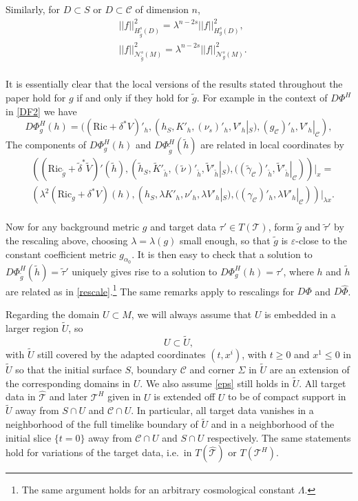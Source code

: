 \documentclass[10pt]{amsart}
\renewcommand{\a}{\alpha}
\newcommand{\g}{\gamma}
\renewcommand{\d}{\delta}
\newcommand{\e}{\varepsilon}
\newcommand{\Si}{\Sigma}
\renewcommand{\l}{\lambda}
\newcommand{\cC}{{\mathcal C}}
\newcommand{\cT}{{\mathcal T}}
\newcommand{\cN}{{\mathcal N}}
\newcommand{\Ric}{\mathrm{Ric}}
\newcommand{\be}{\begin{equation}}
\newcommand{\ee}{\end{equation}}
\newcommand{\bes}{\begin{equation*}}
\newcommand{\ees}{\end{equation*}}
\renewcommand{\hat}{\widehat}
\newcommand{\<}{\langle}
\renewcommand{\>}{\rangle}
\newcommand{\w}{\widetilde}
\theoremstyle{plain}
\theoremstyle{remark}
\theoremstyle{definition}
\numberwithin{equation}{section}
\begin{document}
  Similarly, for $D \subset S$ or $D \subset \cC$ of dimension $n$, 
\be \label{lscale}
\begin{split}
&||f||_{H_{\w g}^s(D)}^2 = \l^{n - 2s} ||f||_{H_g^s(D)}^2, \\ 
&||f||_{\cN_{\w g}^s(M)}^2 = \l^{n- 2s} ||f||_{\cN_g^s(M)}^2 . \\
\end{split}
\ee
 
  \medskip 
 
  It is essentially clear that the local versions of the results stated throughout the paper hold for $g$ if and only if they hold for $\w g$. For example 
in the context of $D\Phi^H$ in \eqref{DF2} we have  
$$D\Phi_g^H(h) = ((\Ric + \d^*V)'_h, (h_S, K'_h, (\nu_s)'_h, V'_h |_S), (g_{\cC})'_h, V'_h |_{\cC}),$$
The components of $D\Phi_g^H(h)$ and $D\Phi_{\w g}^H(\w h)$ are related in local coordinates by
\bes
\begin{split}
&((\Ric_{\w g} + \w \d^*\w V)'(\w h), (\w h_S, \w K'_{\w h}, (\w \nu)'_{\w h}, \w V'_{\w h} |_S), ((\w \g_{\cC})'_{\w h}, \w V'_{\w h} |_{\cC})) |_x = \\
&(\l^2 (\Ric_g + \d^*V)(h), (h_S, \l K'_{h}, \nu'_h, \l V'_h |_S), ((\g_{\cC})'_h, \l V'_h |_{\cC}) )|_{\l x}.\\
\end{split}
\ees

  Now for any background metric $g$ and target data $\tau' \in T(\cT)$, form $\w g$ and $\w \tau'$ by the rescaling 
above, choosing $\l = \l(g)$ small enough, so that $\w g$ is $\e$-close to the constant coefficient metric $g_{\a_0}$. It is then easy to check 
that a solution to $D\Phi_{\w g}^H(\w h)=\w \tau'$ uniquely gives rise to a solution to $D\Phi_g^H(h)=\tau'$, where $h$ and $\w h$ 
are related as in \eqref{rescale}.\footnote{The same argument holds for an arbitrary cosmological constant $\Lambda$.} The same 
remarks apply to rescalings for $D\Phi$ and $D \hat \Phi$. 


   Regarding the domain $U \subset M$,  we will always assume that $U$ is embedded in a larger region $\w U$, so 
$$U \subset \w U,$$
with $\w U$ still covered by the adapted coordinates $(t, x^i)$, with $t \geq 0$ and $x^1 \leq 0$ in $\w U$ so that the initial surface $S$, boundary 
$\cC$ and corner $\Si$ in $\w U$ are an extension of the corresponding domains in $U$. We also assume \eqref{eps} still holds in $\w U$. 
All target data in $\hat \cT$ and later $\cT^H$ given in $U$ is extended off $U$ to be of compact support in $\w U$ away 
from $S\cap U$ and $\cC \cap U$. In particular, all target data vanishes in a neighborhood of the full timelike boundary of $\w U$ and in 
a neighborhood of the initial slice $\{t = 0\}$ away from $\cC \cap U$ and $S \cap U$ respectively. The same statements hold for variations of the 
target data, i.e.~in $T(\hat \cT)$ or $T(\cT^H)$. 
\end{document}
